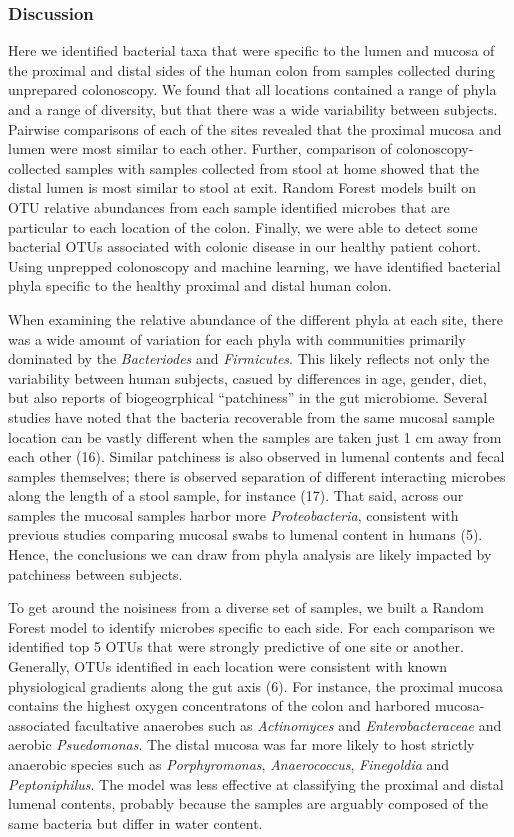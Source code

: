 \documentclass[11pt,]{article}
\begin{document}
\subsubsection{Discussion}\label{discussion}

Here we identified bacterial taxa that were specific to the lumen and
mucosa of the proximal and distal sides of the human colon from samples
collected during unprepared colonoscopy. We found that all locations
contained a range of phyla and a range of diversity, but that there was
a wide variability between subjects. Pairwise comparisons of each of the
sites revealed that the proximal mucosa and lumen were most similar to
each other. Further, comparison of colonoscopy-collected samples with
samples collected from stool at home showed that the distal lumen is
most similar to stool at exit. Random Forest models built on OTU
relative abundances from each sample identified microbes that are
particular to each location of the colon. Finally, we were able to
detect some bacterial OTUs associated with colonic disease in our
healthy patient cohort. Using unprepped colonoscopy and machine
learning, we have identified bacterial phyla specific to the healthy
proximal and distal human colon.

When examining the relative abundance of the different phyla at each
site, there was a wide amount of variation for each phyla with
communities primarily dominated by the \emph{Bacteriodes} and
\emph{Firmicutes}. This likely reflects not only the variability between
human subjects, casued by differences in age, gender, diet, but also
reports of biogeogrphical ``patchiness'' in the gut microbiome. Several
studies have noted that the bacteria recoverable from the same mucosal
sample location can be vastly different when the samples are taken just
1 cm away from each other (16). Similar patchiness is also observed in
lumenal contents and fecal samples themselves; there is observed
separation of different interacting microbes along the length of a stool
sample, for instance (17). That said, across our samples the mucosal
samples harbor more \emph{Proteobacteria}, consistent with previous
studies comparing mucosal swabs to lumenal content in humans (5). Hence,
the conclusions we can draw from phyla analysis are likely impacted by
patchiness between subjects.

To get around the noisiness from a diverse set of samples, we built a
Random Forest model to identify microbes specific to each side. For each
comparison we identified top 5 OTUs that were strongly predictive of one
site or another. Generally, OTUs identified in each location were
consistent with known physiological gradients along the gut axis (6).
For instance, the proximal mucosa contains the highest oxygen
concentratons of the colon and harbored mucosa-associated facultative
anaerobes such as \emph{Actinomyces} and \emph{Enterobacteraceae} and
aerobic \emph{Psuedomonas}. The distal mucosa was far more likely to
host strictly anaerobic species such as \emph{Porphyromonas},
\emph{Anaerococcus}, \emph{Finegoldia} and \emph{Peptoniphilus}. The
model was less effective at classifying the proximal and distal lumenal
contents, probably because the samples are arguably composed of the same
bacteria but differ in water content.
\end{document}
